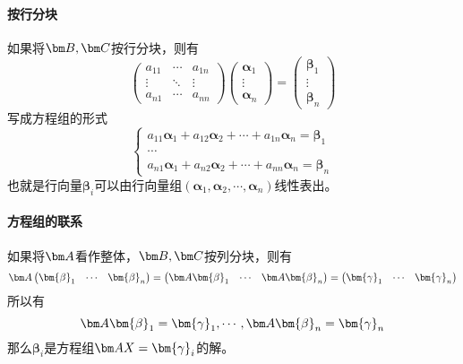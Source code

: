 \paragraph{按行分块}如果将$\mat{B},\mat{C}$按行分块，则有
\[
    \begin{pmatrix}
        a_{11} & \cdots & a_{1n} \\
        \vdots & \ddots & \vdots \\
        a_{n1} & \cdots & a_{nn}
    \end{pmatrix}
    \begin{pmatrix}
        \bm{\alpha}_1 \\ \vdots \\ \bm{\alpha}_n
    \end{pmatrix}
    =
    \begin{pmatrix}
        \bm{\beta}_1 \\ \vdots \\ \bm{\beta}_n
    \end{pmatrix}
\]
写成方程组的形式
\[
    \begin{cases}
        a_{11}\bm{\alpha}_1 + a_{12}\bm{\alpha}_2 + \cdots + a_{1n}\bm{\alpha}_n = \bm{\beta}_1 \\
        \cdots                                                                                  \\
        a_{n1}\bm{\alpha}_1 + a_{n2}\bm{\alpha}_2 + \cdots + a_{nn}\bm{\alpha}_n = \bm{\beta}_n
    \end{cases}
\]
也就是行向量$\bm{\beta}_i$可以由行向量组$(\bm{\alpha}_1,\bm{\alpha}_2,\cdots,\bm{\alpha}_n)$线性表出。

\paragraph{方程组的联系} 如果将$\mat{A}$看作整体，$\mat{B},\mat{C}$按列分块，则有
\[
    \mat{A}
    \begin{pmatrix}
        \bm{\beta}_1 & \cdots & \bm{\beta}_n
    \end{pmatrix}
    =
    \begin{pmatrix}
        \mat{A}\bm{\beta}_1 & \cdots & \mat{A}\bm{\beta}_n
    \end{pmatrix}
    =
    \begin{pmatrix}
        \bm{\gamma}_1 & \cdots & \bm{\gamma}_n
    \end{pmatrix}
\]
所以有
\[ \mat{A}\bm{\beta}_1 = \bm{\gamma}_1, \cdots, \mat{A}\bm{\beta}_n = \bm{\gamma}_n \]
那么$\bm{\beta}_i$是方程组$\mat{AX}=\bm{\gamma}_i$的解。

